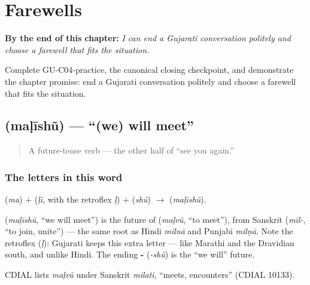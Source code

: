 
\chapter{Farewells}
\label{ch:farewells}

\begin{chapteropening}
\textbf{By the end of this chapter:} \emph{I can end a Gujarati conversation politely and choose a farewell that fits the situation.}

Complete GU-C04-practice, the canonical closing checkpoint, and demonstrate the chapter promise: end a Gujarati conversation politely and choose a farewell that fits the situation.
\end{chapteropening}

\section[\texorpdfstring{\gu{મળીશું} (maḷīshũ)}{મળીશું (maḷīshũ)}]{ (maḷīshũ) — \textquotedblleft{}(we) will meet\textquotedblright{}}

\label{lesson:GU-C04-malishun}



\begin{quote}
A future-tense verb — the other half of \textquotedblleft{}see you again.\textquotedblright{}
\end{quote}

\subsection*{The letters in this word}
\textbf{} (\emph{ma}) + \textbf{} (\emph{ḷī}, with the retroflex \textbf{} \emph{ḷ}) + \textbf{} (\emph{shũ}) $\to$ \textbf{} (\emph{maḷīshũ}).

\begin{cousinweb}
\textbf{} (\emph{maḷīshũ}, \textquotedblleft{}we will meet\textquotedblright{}) is the future of \textbf{} (\emph{maḷvũ}, \textquotedblleft{}to meet\textquotedblright{}), from Sanskrit \textbf{} (\emph{mil-}, \textquotedblleft{}to join, unite\textquotedblright{}) — the same root as Hindi \emph{milnā} and Punjabi \emph{milṇā}. Note the retroflex \textbf{} (\emph{ḷ}): Gujarati keeps this extra letter — like Marathi and the Dravidian south, and unlike Hindi. The ending \textbf{-} (\emph{-shũ}) is the \textquotedblleft{}we will\textquotedblright{} future.

CDIAL lists \emph{maḷvũ} under Sanskrit \emph{milati}, \textquotedblleft{}meets, encounters\textquotedblright{} (CDIAL 10133).
\end{cousinweb}

